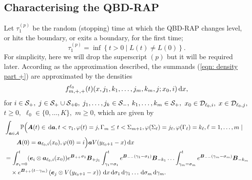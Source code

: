 \subsection{Characterising the QBD-RAP} 
Let \(\tau_1^{(p)}\) be the random (stopping) time at which the QBD-RAP changes level, or hits the boundary, or exits a boundary, for the first time;
\[\tau_1^{(p)} = \inf\left\{t>0\mid L(t)\neq L(0)\right\}.\]
For simplicity, here we will drop the superscript \((p)\) but it will be required later. According as the approximation described, the summands (\ref{eqn: density part +}) are approximated by the densities \[f^{\ell_0}_{m,+,+}(t)( x, j_1,k_1,\dots,j_m,k_m, j; x_0,i)\, \mathrm{d} x,\] 
for \(i\in\mathcal{S}_+,\) \(j\in\mathcal{S}_+\cup\mathcal{S}_{+0},\) \( j_1,\dots,j_k\in\mathcal{S}_-,\) \(k_1,\dots,k_m\in\mathcal{S}_+,\) \(x_0\in\mathcal{D}_{\ell_0,i},\) \(x\in\mathcal{D}_{\ell_0,j},\) \(t\geq0,\) \(\ell_0\in\{0,\dots,K\},\) \(m\geq 0\), which are given by
\begin{align}
	&\int_{\boldsymbol a \in\mathcal A}\mathbb P\Big(\boldsymbol A(t)\in \, \mathrm{d} \boldsymbol a, t<\tau_1, \varphi(t) = j, \Gamma_m\leq t<\Sigma_{m+1}, \nonumber
	\varphi(\Sigma_\ell) = j_\ell , \varphi(\Gamma_\ell) = k_\ell, \ell = 1,\dots,m \mid 
	\\&\qquad \boldsymbol A(0) = \boldsymbol   a_{\ell_0,i}(x_0), \varphi(0) = i\Big)\boldsymbol aV(y_{\ell_0+1}-x)\, \mathrm{d} x\nonumber
	\\
	&=\int_{\sigma_1=0}^t (\boldsymbol e_i\otimes \boldsymbol  a_{\ell_0,i}(x_0)) e^{\boldsymbol{B}_{++}\sigma_1}\boldsymbol{B}_{+{j_1}}	\nonumber
	\int_{\gamma_1=\sigma_1}^{t} e^{\boldsymbol{B}_{--}(\gamma_1-\sigma_1)}\boldsymbol{B}_{-{k_1}}
	\hdots 
	 \int_{\gamma_m=\sigma_{m}}^{t} e^{\boldsymbol{B}_{--}(\gamma_m-\sigma_{m})}\boldsymbol{B}_{-{k_m}}\\&\quad\times
	e^{\boldsymbol{B}_{++}(t-\gamma_m)}\left(\boldsymbol e_j  \otimes V(y_{\ell_0+1}-x)\right)\, \mathrm{d} x
	\, \mathrm{d} \sigma_1\, \mathrm{d} \gamma_1\dots \, \mathrm{d} \sigma_m\, \mathrm{d} \gamma_m. \label{eqn: approx end conv}
\end{align}
